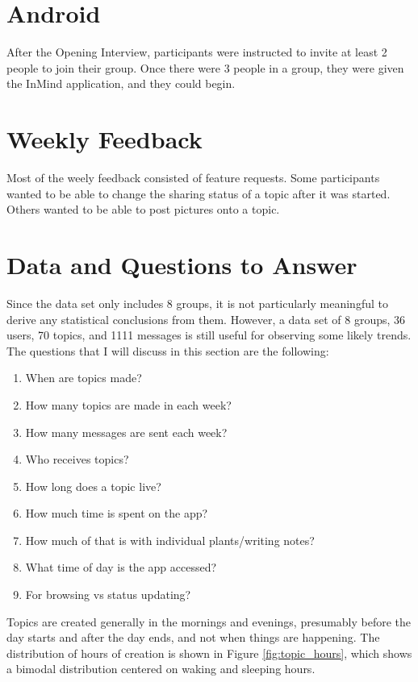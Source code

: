 \section{Android}
  After the Opening Interview, participants were instructed to invite
  at least 2 people to join their group.
  Once there were 3 people in a group,
  they were given the InMind application,
  and they could begin.

  \section{Weekly Feedback}
  Most of the weely feedback consisted of feature requests.
  Some participants wanted to be able to change the sharing status
  of a topic after it was started.
  Others wanted to be able to post pictures onto a topic.

  \section{Data and Questions to Answer}
    Since the data set only includes 8 groups,
    it is not particularly meaningful to derive any statistical conclusions
    from them.
    However, a data set of 8 groups, 36 users, 70 topics, and 1111 messages
    is still useful for observing some likely trends.
    The questions that I will discuss in this section are the following:
    \begin{enumerate}
      \item When are topics made?
      \item How many topics are made in each week?
      \item How many messages are sent each week?
      \item Who receives topics?
      \item How long does a topic live?
      \item How much time is spent on the app?
      \item How much of that is with individual plants/writing notes?
      \item What time of day is the app accessed?
      \item For browsing vs status updating?
    \end{enumerate}

    Topics are created generally in the mornings and evenings,
    presumably before the day starts and after the day ends,
    and not when things are happening.
    The distribution of hours of creation is shown in
    Figure \ref{fig:topic_hours},
    which shows a bimodal distribution centered on waking and sleeping hours.

